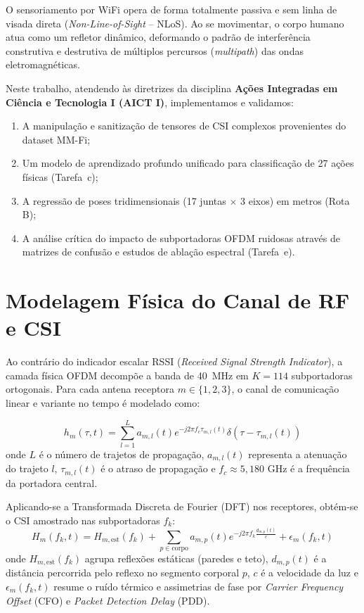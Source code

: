 \documentclass[10pt,a4paper,twocolumn]{article}
\begin{document}
O sensoriamento por WiFi opera de forma totalmente passiva e sem linha de visada direta (\textit{Non-Line-of-Sight} -- NLoS). Ao se movimentar, o corpo humano atua como um refletor dinâmico, deformando o padrão de interferência construtiva e destrutiva de múltiplos percursos (\textit{multipath}) das ondas eletromagnéticas. 

Neste trabalho, atendendo às diretrizes da disciplina \textbf{Ações Integradas em Ciência e Tecnologia I (AICT I)}, implementamos e validamos:
\begin{enumerate}
    \item A manipulação e sanitização de tensores de CSI complexos provenientes do dataset MM-Fi;
    \item Um modelo de aprendizado profundo unificado para classificação de 27 ações físicas (Tarefa~c);
    \item A regressão de poses tridimensionais (17 juntas $\times$ 3 eixos) em metros (Rota B);
    \item A análise crítica do impacto de subportadoras OFDM ruidosas através de matrizes de confusão e estudos de ablação espectral (Tarefa~e).
\end{enumerate}

\section{Modelagem Física do Canal de RF e CSI}

Ao contrário do indicador escalar RSSI (\textit{Received Signal Strength Indicator}), a camada física OFDM decompõe a banda de 40~MHz em $K = 114$ subportadoras ortogonais. Para cada antena receptora $m \in \{1, 2, 3\}$, o canal de comunicação linear e variante no tempo é modelado como:

\begin{equation}
h_m(\tau, t) = \sum_{l=1}^{L} a_{m,l}(t) e^{-j 2\pi f_c \tau_{m,l}(t)} \delta(\tau - \tau_{m,l}(t))
\end{equation}
onde $L$ é o número de trajetos de propagação, $a_{m,l}(t)$ representa a atenuação do trajeto $l$, $\tau_{m,l}(t)$ é o atraso de propagação e $f_c \approx 5{,}180\text{ GHz}$ é a frequência da portadora central.

Aplicando-se a Transformada Discreta de Fourier (DFT) nos receptores, obtém-se o CSI amostrado nas subportadoras $f_k$:
\begin{equation}
H_m(f_k, t) = H_{m, \text{est}}(f_k) + \sum_{p \in \text{corpo}} a_{m,p}(t) e^{-j 2\pi f_k \frac{d_{m,p}(t)}{c}} + \epsilon_m(f_k, t)
\end{equation}
onde $H_{m, \text{est}}(f_k)$ agrupa reflexões estáticas (paredes e teto), $d_{m,p}(t)$ é a distância percorrida pelo reflexo no segmento corporal $p$, $c$ é a velocidade da luz e $\epsilon_m(f_k, t)$ resume o ruído térmico e assimetrias de fase por \textit{Carrier Frequency Offset} (CFO) e \textit{Packet Detection Delay} (PDD).
\end{document}
